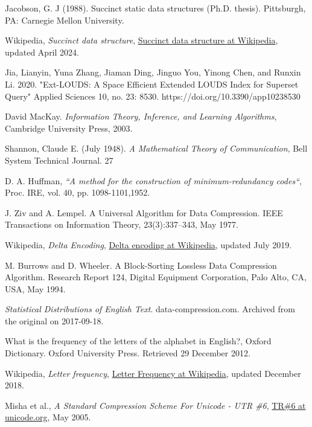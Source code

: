 \documentclass[]{article}
\begin{document}
	\begin{thebibliography}{1}

		 Jacobson, G. J (1988). Succinct static data structures (Ph.D. thesis). Pittsburgh, PA: Carnegie Mellon University.

		 Wikipedia, {\em Succinct data structure}, \href{https://en.wikipedia.org/wiki/Succinct_data_structure}{Succinct data structure at Wikipedia}, updated April 2024.


Jia, Lianyin, Yuna Zhang, Jiaman Ding, Jinguo You, Yinong Chen, and Runxin Li. 2020. "Ext-LOUDS: A Space Efficient Extended LOUDS Index for Superset Query" Applied Sciences 10, no. 23: 8530. https://doi.org/10.3390/app10238530

		 David MacKay. {\em Information Theory, Inference, and Learning Algorithms}, Cambridge University Press, 2003.
		
		 Shannon, Claude E. (July 1948). {\em A Mathematical Theory of Communication}, Bell System Technical Journal. 27
		
		 D. A. Huffman, {\em“A method for the construction of minimum-redundancy codes“}, Proc. IRE, vol. 40, pp. 1098-1101,1952.
		
		 J. Ziv and A. Lempel. A Universal Algorithm for Data Compression. IEEE Transactions on Information Theory, 23(3):337–343, May 1977.
		
		 Wikipedia, {\em Delta Encoding}, \href{https://en.wikipedia.org/wiki/Delta\_encoding}{Delta encoding at Wikipedia}, updated July 2019.
		
		 M. Burrows and D. Wheeler. A Block-Sorting Lossless Data Compression Algorithm. Research Report 124, Digital Equipment Corporation, Palo Alto, CA, USA, May 1994.
		
		 {\em Statistical Distributions of English Text}. data-compression.com. Archived from the original on 2017-09-18.
		
		 What is the frequency of the letters of the alphabet in English?, Oxford Dictionary. Oxford University Press. Retrieved 29 December 2012.
		
		 Wikipedia, {\em Letter frequency}, \href{https://en.wikipedia.org/wiki/Letter\_frequency}{Letter Frequency at Wikipedia}, updated December 2018.
		
		 Misha et al., {\em A Standard Compression Scheme For Unicode - UTR \#6}, \href{https://www.unicode.org/reports/tr6/tr6-4.html}{TR\#6 at unicode.org}, May 2005.
		

\end{thebibliography}
\end{document}

